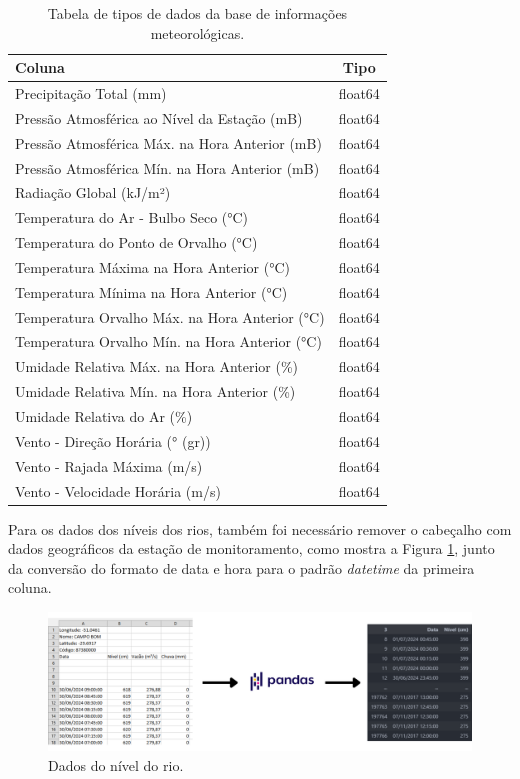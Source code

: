 \begin{table}[H]
	\centering
	\begin{tabular}{|p{10cm}|c|}
	\hline
	\textbf{Coluna} & \textbf{Tipo} \\
	\hline
	Precipitação Total (mm) & float64 \\
	Pressão Atmosférica ao Nível da Estação (mB) & float64 \\
	Pressão Atmosférica Máx. na Hora Anterior (mB) & float64 \\
	Pressão Atmosférica Mín. na Hora Anterior (mB) & float64 \\
	Radiação Global (kJ/m²) & float64 \\
	Temperatura do Ar - Bulbo Seco (°C) & float64 \\
	Temperatura do Ponto de Orvalho (°C) & float64 \\
	Temperatura Máxima na Hora Anterior (°C) & float64 \\
	Temperatura Mínima na Hora Anterior (°C) & float64 \\
	Temperatura Orvalho Máx. na Hora Anterior (°C) & float64 \\
	Temperatura Orvalho Mín. na Hora Anterior (°C) & float64 \\
	Umidade Relativa Máx. na Hora Anterior (\%) & float64 \\
	Umidade Relativa Mín. na Hora Anterior (\%) & float64 \\
	Umidade Relativa do Ar (\%) & float64 \\
	Vento - Direção Horária (° (gr)) & float64 \\
	Vento - Rajada Máxima (m/s) & float64 \\
	Vento - Velocidade Horária (m/s) & float64 \\
	\hline
	\end{tabular}
	\caption{Tabela de tipos de dados da base de informações meteorológicas.}
	\label{tab:colunas_dados_meteorologicos}
\end{table}

Para os dados dos níveis dos rios, também foi necessário remover o cabeçalho com dados geográficos da estação de monitoramento, como mostra a Figura \ref{fig:base_sema}, junto da conversão do formato de data e hora para o padrão \textit{datetime} da primeira coluna.

\begin{figure}[H]
	\caption{\label{fig:base_sema}Dados do nível do rio.}
	\begin{center}
		\includegraphics[scale=0.3]{figuras/base_sema.png}
	\end{center}
\end{figure}

